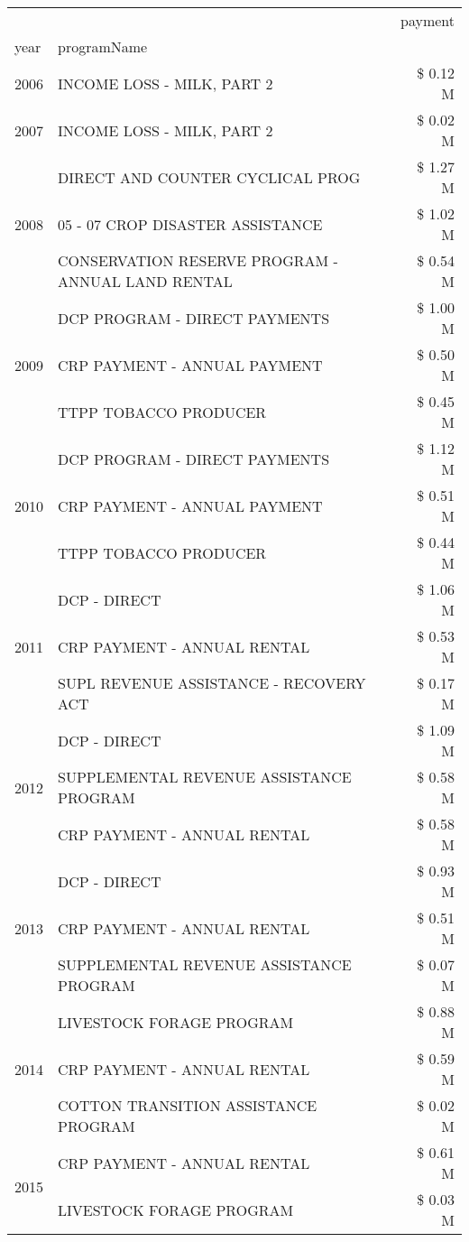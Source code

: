 \begin{tabular}{llr}
\toprule
 &  & payment \\
year & programName &  \\
\midrule
2006 & INCOME LOSS - MILK, PART 2 & \$ 0.12 M \\
\cline{1-3}
2007 & INCOME LOSS - MILK, PART 2 & \$ 0.02 M \\
\cline{1-3}
\multirow[t]{3}{*}{2008} & DIRECT AND COUNTER CYCLICAL PROG & \$ 1.27 M \\
 & 05 - 07 CROP DISASTER ASSISTANCE & \$ 1.02 M \\
 & CONSERVATION RESERVE PROGRAM - ANNUAL LAND RENTAL & \$ 0.54 M \\
\cline{1-3}
\multirow[t]{3}{*}{2009} & DCP PROGRAM - DIRECT PAYMENTS & \$ 1.00 M \\
 & CRP PAYMENT - ANNUAL PAYMENT & \$ 0.50 M \\
 & TTPP TOBACCO PRODUCER & \$ 0.45 M \\
\cline{1-3}
\multirow[t]{3}{*}{2010} & DCP PROGRAM - DIRECT PAYMENTS & \$ 1.12 M \\
 & CRP PAYMENT - ANNUAL PAYMENT & \$ 0.51 M \\
 & TTPP TOBACCO PRODUCER & \$ 0.44 M \\
\cline{1-3}
\multirow[t]{3}{*}{2011} & DCP - DIRECT & \$ 1.06 M \\
 & CRP PAYMENT - ANNUAL RENTAL & \$ 0.53 M \\
 & SUPL REVENUE ASSISTANCE - RECOVERY ACT & \$ 0.17 M \\
\cline{1-3}
\multirow[t]{3}{*}{2012} & DCP - DIRECT & \$ 1.09 M \\
 & SUPPLEMENTAL REVENUE ASSISTANCE PROGRAM & \$ 0.58 M \\
 & CRP PAYMENT - ANNUAL RENTAL & \$ 0.58 M \\
\cline{1-3}
\multirow[t]{3}{*}{2013} & DCP - DIRECT & \$ 0.93 M \\
 & CRP PAYMENT - ANNUAL RENTAL & \$ 0.51 M \\
 & SUPPLEMENTAL REVENUE ASSISTANCE PROGRAM & \$ 0.07 M \\
\cline{1-3}
\multirow[t]{3}{*}{2014} & LIVESTOCK FORAGE PROGRAM & \$ 0.88 M \\
 & CRP PAYMENT - ANNUAL RENTAL & \$ 0.59 M \\
 & COTTON TRANSITION ASSISTANCE PROGRAM & \$ 0.02 M \\
\cline{1-3}
\multirow[t]{3}{*}{2015} & CRP PAYMENT - ANNUAL RENTAL & \$ 0.61 M \\
 & LIVESTOCK FORAGE PROGRAM & \$ 0.03 M \\

\end{tabular}
